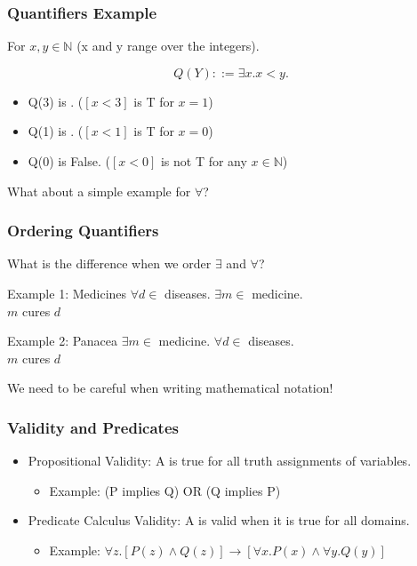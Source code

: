\documentclass{beamer}
\begin{document}
\begin{frame}
  \frametitle{Quantifiers Example}

  For $x,y \in \mathbb{N}$ (x and y range over the integers).

  \begin{equation*}
    Q(Y) ::= \exists x. x < y.
  \end{equation*}

  \begin{itemize}
  \item Q(3) is . ($[x < 3]$ is T for $x = 1$)
  \item Q(1) is . ($[x < 1]$ is T for $x = 0$)
  \item Q(0) is \alert{False}. ($[x < 0]$ is not T for any $x\in\mathbb{N}$)
  \end{itemize}

  \bigskip

  What about a simple example for $\forall$?
\end{frame}

\begin{frame}
  \frametitle{Ordering Quantifiers}
  What is the difference when we order $\exists$ and $\forall$?

  \bigskip

  \begin{block}{Example 1: Medicines}
    $\forall d \in$ diseases. $\exists m \in$ medicine.\\
    $m$ cures $d$
  \end{block}

  \begin{block}{Example 2: Panacea}
    $\exists m \in$ medicine. $\forall d \in$ diseases.\\
    $m$ cures $d$
  \end{block}

  We need to be careful when writing mathematical notation!

\end{frame}

\begin{frame}
  \frametitle{Validity and Predicates}
  \begin{itemize}
  \item Propositional Validity: A  is true for
    all truth assignments of variables.
    \begin{itemize}
    \item Example: (P implies Q) OR (Q implies P)
    \end{itemize}

    \bigskip

  \item Predicate Calculus Validity: A  is valid
    when it is true for all domains.
    \begin{itemize}
    \item Example: $\forall z. [P(z) \land Q(z)] \rightarrow [\forall x.P(x) \land \forall y.Q(y)]$
    \end{itemize}
  \end{itemize}


\end{frame}
\end{document}
